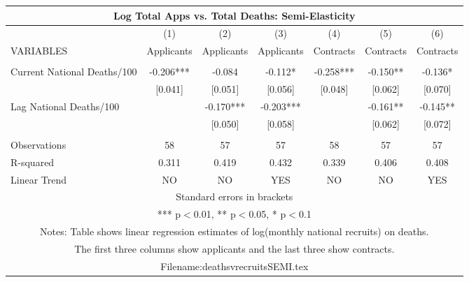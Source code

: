 \documentclass[]{article}
\begin{document}
\begin{tabular}{lcccccc}
\multicolumn{7}{c}{Log Total Apps vs. Total Deaths: Semi-Elasticity} \\ \hline
 & (1) & (2) & (3) & (4) & (5) & (6) \\
VARIABLES & Applicants & Applicants & Applicants & Contracts & Contracts & Contracts \\ \hline
 &  &  &  &  &  &  \\
Current National Deaths/100 & -0.206*** & -0.084 & -0.112* & -0.258*** & -0.150** & -0.136* \\
 & [0.041] & [0.051] & [0.056] & [0.048] & [0.062] & [0.070] \\
Lag National Deaths/100 &  & -0.170*** & -0.203*** &  & -0.161** & -0.145** \\
 &  & [0.050] & [0.058] &  & [0.062] & [0.072] \\
 &  &  &  &  &  &  \\
Observations & 58 & 57 & 57 & 58 & 57 & 57 \\
R-squared & 0.311 & 0.419 & 0.432 & 0.339 & 0.406 & 0.408 \\
 Linear Trend & NO & NO & YES & NO & NO & YES \\ \hline
\multicolumn{7}{c}{ Standard errors in brackets} \\
\multicolumn{7}{c}{ *** p$<$0.01, ** p$<$0.05, * p$<$0.1} \\
\multicolumn{7}{c}{ Notes: Table shows linear regression estimates of log(monthly national recruits) on deaths.} \\
\multicolumn{7}{c}{ The first three columns show applicants and the last three show contracts.} \\
\multicolumn{7}{c}{ Filename:deathsvrecruitsSEMI.tex} \\
\end{tabular}
\end{document}
